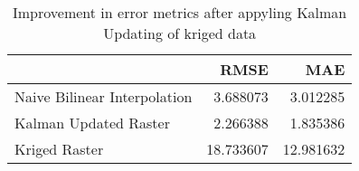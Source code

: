 \begin{table}
\caption{Improvement in error metrics after appyling Kalman Updating of kriged data}
\label{tab:oahu1_lidar_error}
\begin{tabular}{lrr}
\toprule
 & RMSE & MAE \\
\midrule
Naive Bilinear Interpolation & 3.688073 & 3.012285 \\
Kalman Updated Raster & 2.266388 & 1.835386 \\
Kriged Raster & 18.733607 & 12.981632 \\
\bottomrule
\end{tabular}
\end{table}
